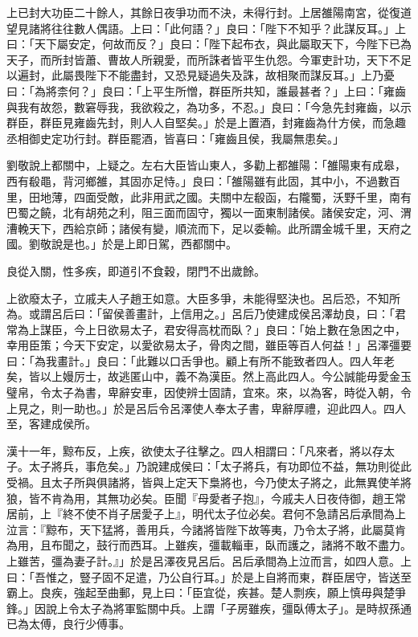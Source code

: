 \begin{pinyinscope}
上已封大功臣二十餘人，其餘日夜爭功而不決，未得行封。上居雒陽南宮，從復道望見諸將往往數人偶語。上曰：「此何語？」良曰：「陛下不知乎？此謀反耳。」上曰：「天下屬安定，何故而反？」良曰：「陛下起布衣，與此屬取天下，今陛下已為天子，而所封皆蕭、曹故人所親愛，而所誅者皆平生仇怨。今軍吏計功，天下不足以遍封，此屬畏陛下不能盡封，又恐見疑過失及誅，故相聚而謀反耳。」上乃憂曰：「為將柰何？」良曰：「上平生所憎，群臣所共知，誰最甚者？」上曰：「雍齒與我有故怨，數窘辱我，我欲殺之，為功多，不忍。」良曰：「今急先封雍齒，以示群臣，群臣見雍齒先封，則人人自堅矣。」於是上置酒，封雍齒為什方侯，而急趣丞相御史定功行封。群臣罷酒，皆喜曰：「雍齒且侯，我屬無患矣。」

劉敬說上都關中，上疑之。左右大臣皆山東人，多勸上都雒陽：「雒陽東有成皋，西有殽黽，背河鄉雒，其固亦足恃。」良曰：「雒陽雖有此固，其中小，不過數百里，田地薄，四面受敵，此非用武之國。夫關中左殽函，右隴蜀，沃野千里，南有巴蜀之饒，北有胡苑之利，阻三面而固守，獨以一面東制諸侯。諸侯安定，河、渭漕輓天下，西給京師；諸侯有變，順流而下，足以委輸。此所謂金城千里，天府之國。劉敬說是也。」於是上即日駕，西都關中。

良從入關，性多疾，即道引不食穀，閉門不出歲餘。

上欲廢太子，立戚夫人子趙王如意。大臣多爭，未能得堅決也。呂后恐，不知所為。或謂呂后曰：「留侯善畫計，上信用之。」呂后乃使建成侯呂澤劫良，曰：「君常為上謀臣，今上日欲易太子，君安得高枕而臥？」良曰：「始上數在急困之中，幸用臣策；今天下安定，以愛欲易太子，骨肉之間，雖臣等百人何益！」呂澤彊要曰：「為我畫計。」良曰：「此難以口舌爭也。顧上有所不能致者四人。四人年老矣，皆以上嫚厉士，故逃匿山中，義不為漢臣。然上高此四人。今公誠能毋愛金玉璧帛，令太子為書，卑辭安車，因使辨士固請，宜來。來，以為客，時從入朝，令上見之，則一助也。」於是呂后令呂澤使人奉太子書，卑辭厚禮，迎此四人。四人至，客建成侯所。

漢十一年，黥布反，上疾，欲使太子往擊之。四人相謂曰：「凡來者，將以存太子。太子將兵，事危矣。」乃說建成侯曰：「太子將兵，有功即位不益，無功則從此受禍。且太子所與俱諸將，皆與上定天下梟將也，今乃使太子將之，此無異使羊將狼，皆不肯為用，其無功必矣。臣聞『母愛者子抱』，今戚夫人日夜侍御，趙王常居前，上『終不使不肖子居愛子上』，明代太子位必矣。君何不急請呂后承間為上泣言：『黥布，天下猛將，善用兵，今諸將皆陛下故等夷，乃令太子將，此屬莫肯為用，且布聞之，鼓行而西耳。上雖疾，彊載輜車，臥而護之，諸將不敢不盡力。上雖苦，彊為妻子計。』」於是呂澤夜見呂后。呂后承間為上泣而言，如四人意。上曰：「吾惟之，豎子固不足遣，乃公自行耳。」於是上自將而東，群臣居守，皆送至霸上。良疾，強起至曲郵，見上曰：「臣宜從，疾甚。楚人剽疾，願上慎毋與楚爭鋒。」因說上令太子為將軍監關中兵。上謂「子房雖疾，彊臥傅太子」。是時叔孫通已為太傅，良行少傅事。


\end{pinyinscope}
